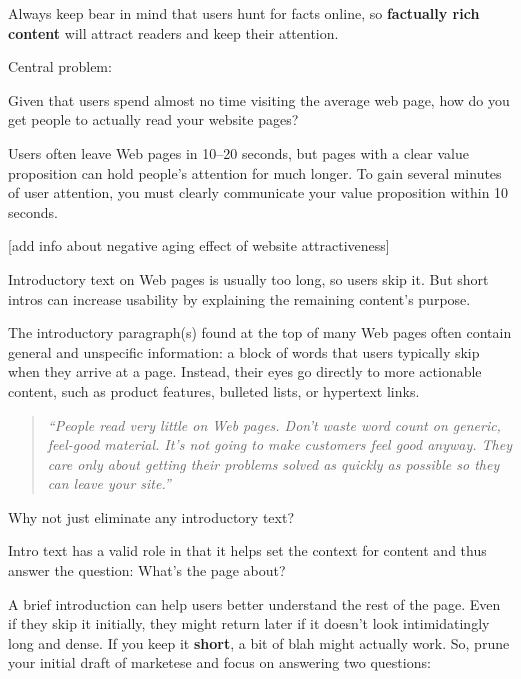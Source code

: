 Always keep bear in mind that users hunt for facts online, so \textbf{factually rich content} will attract readers and keep their attention.

Central problem:

Given that users spend almost no time visiting the average web page, how do you get people to actually read your website pages?

Users often leave Web pages in 10–20 seconds, but pages with a clear value proposition can hold people's attention for much longer. To gain several minutes of user attention, you must clearly communicate your value proposition within 10 seconds.

[add info about negative aging effect of website attractiveness]

Introductory text on Web pages is usually too long, so users skip it. But short intros can increase usability by explaining the remaining content's purpose.

The introductory paragraph(s) found at the top of many Web pages often contain general and unspecific information: a block of words that users typically skip when they arrive at a page. Instead, their eyes go directly to more actionable content, such as product features, bulleted lists, or hypertext links.

\begin{quote}
\emph{``People read very little on Web pages. Don't waste word count on generic, feel-good material. It's not going to make customers feel good anyway. They care only about getting their problems solved as quickly as possible so they can leave your site.''}~
\end{quote}

Why not just eliminate any introductory text?

Intro text has a valid role in that it helps set the context for content and thus answer the question: What's the page about?

A brief introduction can help users better understand the rest of the page. Even if they skip it initially, they might return later if it doesn't look intimidatingly long and dense. If you keep it \textbf{short}, a bit of blah might actually work. So, prune your initial draft of marketese and focus on answering two questions:


